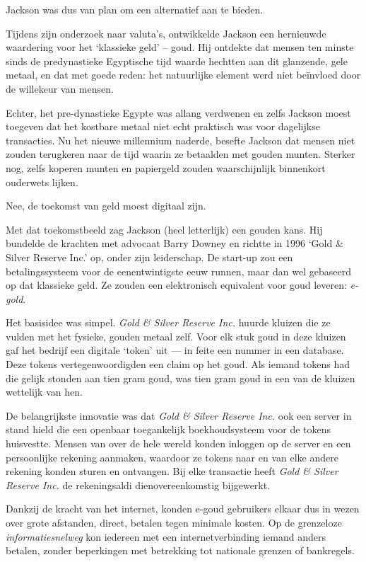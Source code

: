 \documentclass[
  a5paper,
  smalldemyvopaper,11pt,twoside,onecolumn,openright,extrafontsizes]{memoir}
\begin{document}
Jackson was dus van plan om een alternatief aan te bieden.

Tijdens zijn onderzoek naar valuta's, ontwikkelde Jackson een hernieuwde
waardering voor het `klassieke geld' -- goud. Hij ontdekte dat mensen
ten minste sinds de predynastieke Egyptische tijd waarde hechtten aan
dit glanzende, gele metaal, en dat met goede reden: het natuurlijke
element werd niet beïnvloed door de willekeur van mensen.

Echter, het pre-dynastieke Egypte was allang verdwenen en zelfs Jackson
moest toegeven dat het kostbare metaal niet echt praktisch was voor
dagelijkse transacties. Nu het nieuwe millennium naderde, besefte
Jackson dat mensen niet zouden terugkeren naar de tijd waarin ze
betaalden met gouden munten. Sterker nog, zelfs koperen munten en
papiergeld zouden waarschijnlijk binnenkort ouderwets lijken.

Nee, de toekomst van geld moest digitaal zijn.

Met dat toekomstbeeld zag Jackson (heel letterlijk) een gouden kans. Hij
bundelde de krachten met advocaat Barry Downey en richtte in 1996 `Gold
\& Silver Reserve Inc.' op, onder zijn leiderschap. De start-up zou een
betalingssysteem voor de eenentwintigste eeuw runnen, maar dan wel
gebaseerd op dat klassieke geld. Ze zouden een elektronisch equivalent
voor goud leveren: \emph{e-gold}.

Het basisidee was simpel. \emph{Gold \& Silver Reserve Inc.} huurde
kluizen die ze vulden met het fysieke, gouden metaal zelf. Voor elk stuk
goud in deze kluizen gaf het bedrijf een digitale `token' uit --- in
feite een nummer in een database. Deze tokens vertegenwoordigden een
claim op het goud. Als iemand tokens had die gelijk stonden aan tien
gram goud, was tien gram goud in een van de kluizen wettelijk van hen.

De belangrijkste innovatie was dat \emph{Gold \& Silver Reserve Inc.}
ook een server in stand hield die een openbaar toegankelijk
boekhoudsysteem voor de tokens huisvestte. Mensen van over de hele
wereld konden inloggen op de server en een persoonlijke rekening
aanmaken, waardoor ze tokens naar en van elke andere rekening konden
sturen en ontvangen. Bij elke transactie heeft \emph{Gold \& Silver
Reserve Inc.} de rekeningsaldi dienovereenkomstig bijgewerkt.

Dankzij de kracht van het internet, konden e-goud gebruikers elkaar dus
in wezen over grote afstanden, direct, betalen tegen minimale kosten. Op
de grenzeloze \emph{informatiesnelweg} kon iedereen met een
internetverbinding iemand anders betalen, zonder beperkingen met
betrekking tot nationale grenzen of bankregels.
\end{document}
